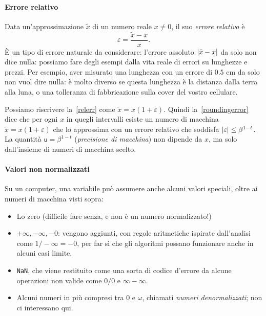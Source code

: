 \documentclass[a4paper]{report}
\DeclarePairedDelimiter{\abs}{\lvert}{\rvert}
\theoremstyle{definiton}
\theoremstyle{remark}
\begin{document}
\paragraph{Errore relativo}
Data un'approssimazione $\tilde{x}$ di un numero reale $x \neq 0$, il suo \emph{errore relativo} è
\begin{equation} \label{relerr}
    \varepsilon = \frac{\tilde{x}-x}{x}.    
\end{equation}
È un tipo di errore naturale da considerare: l'errore assoluto $\abs{\tilde{x}-x}$ da solo non dice nulla: possiamo fare degli esempi dalla vita reale di errori su lunghezze e prezzi. Per esempio, aver misurato una lunghezza con un errore di $0.5 \text{ cm}$ da solo non vuol dire nulla: è molto diverso se questa lunghezza è la distanza dalla terra alla luna, o una tolleranza di fabbricazione sulla cover del vostro cellulare.

Possiamo riscrivere la~\eqref{relerr} come $\tilde{x} = x(1+\varepsilon)$. Quindi la~\eqref{roundingerror} dice che per ogni $x$ in quegli intervalli esiste un numero di macchina $\tilde{x} = x(1+\varepsilon)$ che lo approssima con un errore relativo che soddisfa $\abs{\varepsilon} \leq \beta^{1-t}$. La quantità $\mathsf{u} = \beta^{1-t}$ (\emph{precisione di macchina}) non dipende da $x$, ma solo dall'insieme di numeri di macchina scelto.

\paragraph{Valori non normalizzati}
Su un computer, una variabile può assumere anche alcuni valori speciali, oltre ai numeri di macchina visti sopra:
\begin{itemize}
    \item Lo zero (difficile fare senza, e non è un numero normalizzato!)
    \item $+\infty, -\infty, -0$: vengono aggiunti, con regole aritmetiche ispirate dall'analisi come $1/-\infty = -0$, per far sì che gli algoritmi possano funzionare anche in alcuni casi limite.
    \item \texttt{NaN}, che viene restituito come una sorta di codice d'errore da alcune operazioni non valide come $0/0$ e $\infty-\infty$.
    \item Alcuni numeri in più compresi tra $0$ e $\omega$, chiamati \emph{numeri denormalizzati}; non ci interessano qui.
\end{itemize}
\end{document}
